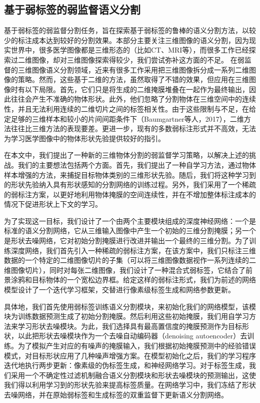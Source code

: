 \subsection{基于弱标签的弱监督语义分割}
基于弱标签的弱监督分割任务，旨在探索基于弱标签的鲁棒的语义分割方法，以较少的标注成本达到较好的分割效果。本部分主要关注三维图像的语义分割，因为现实世界中，很多医学图像都是三维形态的（比如CT、MRI等），而很多工作已经探索过二维图像，却对三维图像探索得较少，我们尝试弥补这方面的不足。
在弱监督的三维图像语义分割领域，近来有很多工作采用把三维图像拆分成一系列二维图像的策略。然而，这些基于二维的方法，虽然取得了不错的效果，但应用在三维图像时有以下局限。首先，它们只是将生成的二维掩膜堆叠在一起作为最终输出，因此往往会产生不准确的物体形状\citep{kervadec2019constrained,2020bounding}。此外，他们忽略了分割物体在三维空间中的连续性，并且无法利用连续的二维切片之间的标签相关性。由于这些限制与不足，在给定足够的三维样本和较小的片间间距条件下（Baumgartner等人，2017），二维方法往往比三维方法的表现要差。更进一步，现有的多数弱标注形式并不高效，无法为学习医学图像中的物体形状先验提供较好的指引。

在本文中，我们提出了一种新的三维物体分割的弱监督学习策略，以解决上述的挑战。我们的主要想法包括两个方面。首先，我们提出了一种自学习方法，通过物体样本增强的方法，来捕捉目标物体类别的三维形状先验。随后，我们将这种学习到的形状先验纳入具有形状感知的分割网络的训练过程。另外，我们采用了一个稀疏的弱标注方案，以更好地利用物体掩膜的空间连续性，并在不增加整体标注成本的情况下促进形状上下文的学习。

为了实现这一目标，我们设计了一个由两个主要模块组成的深度神经网络：一个是标准的语义分割网络，它从三维输入图像中产生一个初始的三维分割掩膜；另一个是形状去噪网络，它对初始分割掩膜进行改进并输出一个最终的三维分割。为了训练深度网络，我们首先引入一种稀疏的弱标注方案，在该方案中，我们只标注三维数据的一个特定的二维图像切片的子集（可以将三维图像数据视作一系列连续的二维图像切片），同时对每张二维图像，我们设计了一种混合式弱标签，它结合了前景涂鸦和目标物体的一个宽松边界框。给定这样的弱标注形式，我们为前述的网络模型设计了一个迭代学习框架，交替进行像素级标签生成和网络参数更新。

具体地，我们首先使用弱标签训练语义分割模块，来初始化我们的网络模型，该模块为训练数据预测生成了初始分割掩膜。然后利用这些初始掩膜，我们用自学习方法来学习形状去噪模块。为此，我们选择具有最高置信度的掩膜预测作为目标形状，以此把形状去噪模块作为一个去噪自动编码器（denoising autoencoder）去训练\citep{vincent2010stacked,Sundermeyer_2018_ECCV}。为了模拟产生对应的有噪声的掩膜输入，我们根据初始掩膜预测中的经验错误模式，对目标形状应用了几种噪声增强方案。在模型初始化之后，我们的学习程序迭代地执行两步更新：像素级的伪标签生成，和神经网络学习。对于标签生成，我们采用一个不确定性过滤机制融合语义分割模块和形状去噪模块的预测输出，这使我们得以利用学习到的形状先验来提高标签质量。在网络学习中，我们冻结了形状去噪网络，并在原始弱标签和生成标签的双重监督下更新语义分割网络。

